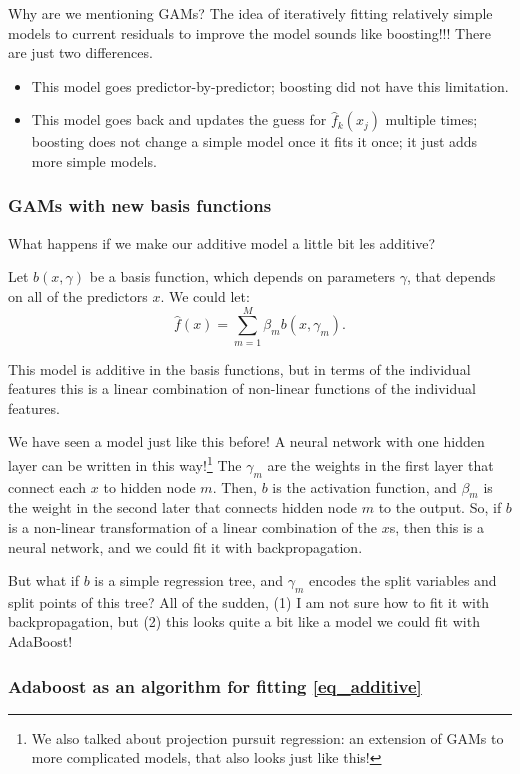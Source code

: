 Why are we mentioning GAMs? The idea of iteratively fitting relatively simple models to current residuals to improve the model sounds like boosting!!! There are just two differences.
\begin{itemize}
\item This model goes predictor-by-predictor; boosting did not have this limitation.
\item This model goes back and updates the guess for $\hat{f}_k(x_j)$ multiple times; boosting does not change a simple model once it fits it once; it just adds more simple models. 
\end{itemize}

\subsubsection{GAMs with new basis functions}

What happens if we make our additive model a little bit les additive? 

Let $b(x, \gamma)$ be a basis function, which depends on parameters $\gamma$, that depends on all of the predictors $x$. We could let: 
\begin{equation}
\label{eq_additive}	
\hat{f}(x) = \sum_{m=1}^M \beta_m b(x, \gamma_m). 
\end{equation}

This model is additive in the basis functions, but in terms of the individual features this is a linear combination of non-linear functions of the individual features. 

We have seen a model just like this before! A neural network with one hidden layer can be written in this way!\footnote{We also talked about projection pursuit regression: an extension of GAMs to more complicated models, that also looks just like this!} The $\gamma_m$ are the weights in the first layer that connect each $x$ to hidden node $m$. Then, $b$ is the activation function, and $\beta_m$ is the weight in the second later that connects hidden node $m$ to the output. So, if $b$ is a non-linear transformation of a linear combination of the $x$s, then this is a neural network, and we could fit it with backpropagation. 

But what if $b$ is a simple regression tree, and $\gamma_m$ encodes the split variables and split points of this tree? All of the sudden, (1) I am not sure how to fit it with backpropagation, but (2) this looks quite a bit like a model we could fit with AdaBoost!

\subsubsection{Adaboost as an algorithm for fitting \eqref{eq_additive}}


